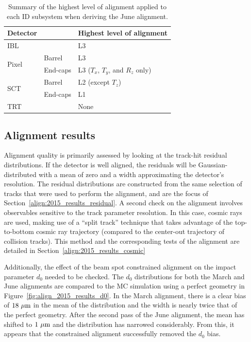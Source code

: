 \begin{table}[htbp]
  \centering
  \begin{tabular}{l l | l}
    Detector & & Highest level of alignment\\
    \hline\hline
    IBL && L3 \\
    \hline
    \multirow{2}{*}{Pixel} & Barrel & L3 \\
                           & End-caps & L3 ($T_x$, $T_y$, and $R_z$ only) \\
    \hline
    \multirow{2}{*}{SCT} & Barrel & L2 (except $T_z$) \\
                           & End-caps & L1 \\
    \hline
    TRT && None\\
    \hline
  \end{tabular} 
  \caption{Summary of the highest level of alignment applied to each ID subsystem when deriving the June alignment.}
  \label{tab:align_june_levels}
\end{table}

\subsection{Alignment results}
Alignment quality is primarily assessed by looking at the track-hit residual distributions.
If the detector is well aligned, the residuals will be Gaussian-distributed with a mean of zero and a width approximating the detector's resolution.
The residual distributions are constructed from the same selection of tracks that were used to perform the alignment, and are the focus of Section~\ref{align:2015_results_residual}.
A second check on the alignment involves observables sensitive to the track parameter resolution.
In this case, cosmic rays are used, making use of a ``split track'' technique that takes advantage of the top-to-bottom cosmic ray trajectory (compared to the center-out trajectory of collision tracks).
This method and the corresponding tests of the alignment are detailed in Section~\ref{align:2015_results_cosmic}

Additionally, the effect of the beam spot constrained alignment on the impact parameter $d_0$ needed to be checked.
The $d_0$ distributions for both the March and June alignments are compared to the MC simulation using a perfect geometry in Figure~\ref{fig:align_2015_results_d0}.
In the March alignment, there is a clear bias of $18~\mu\textrm{m}$ in the mean of the distribution and the width is nearly twice that of the perfect geometry.
After the second pass of the June alignment, the mean has shifted to $1~\mu\textrm{m}$ and the distribution has narrowed considerably.
From this, it appears that the constrained alignment successfully removed the $d_0$ bias.

